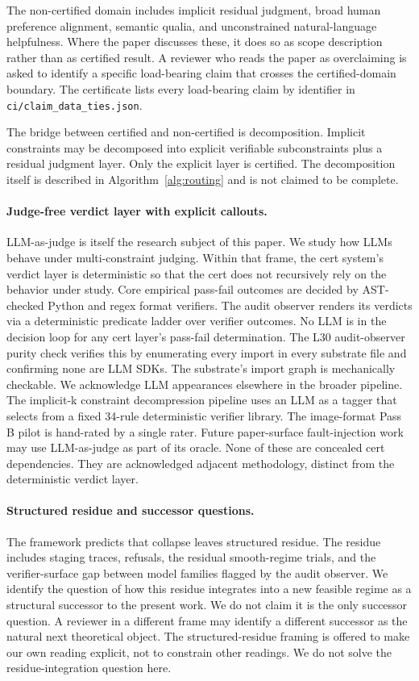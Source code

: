 The non-certified domain includes implicit residual judgment, broad human preference alignment, semantic qualia, and unconstrained natural-language helpfulness. Where the paper discusses these, it does so as scope description rather than as certified result. A reviewer who reads the paper as overclaiming is asked to identify a specific load-bearing claim that crosses the certified-domain boundary. The certificate lists every load-bearing claim by identifier in \texttt{ci/claim\_data\_ties.json}.

The bridge between certified and non-certified is decomposition. Implicit constraints may be decomposed into explicit verifiable subconstraints plus a residual judgment layer. Only the explicit layer is certified. The decomposition itself is described in Algorithm~\ref{alg:routing} and is not claimed to be complete.

\paragraph{Judge-free verdict layer with explicit callouts.}
LLM-as-judge is itself the research subject of this paper. We study how LLMs behave under multi-constraint judging. Within that frame, the cert system's verdict layer is deterministic so that the cert does not recursively rely on the behavior under study. Core empirical pass-fail outcomes are decided by AST-checked Python and regex format verifiers. The audit observer renders its verdicts via a deterministic predicate ladder over verifier outcomes. No LLM is in the decision loop for any cert layer's pass-fail determination. The L30 audit-observer purity check verifies this by enumerating every import in every substrate file and confirming none are LLM SDKs. The substrate's import graph is mechanically checkable. We acknowledge LLM appearances elsewhere in the broader pipeline. The implicit-k constraint decompression pipeline uses an LLM as a tagger that selects from a fixed 34-rule deterministic verifier library. The image-format Pass B pilot is hand-rated by a single rater. Future paper-surface fault-injection work may use LLM-as-judge as part of its oracle. None of these are concealed cert dependencies. They are acknowledged adjacent methodology, distinct from the deterministic verdict layer.

\paragraph{Structured residue and successor questions.}
The framework predicts that collapse leaves structured residue. The residue includes staging traces, refusals, the residual smooth-regime trials, and the verifier-surface gap between model families flagged by the audit observer. We identify the question of how this residue integrates into a new feasible regime as a structural successor to the present work. We do not claim it is the only successor question. A reviewer in a different frame may identify a different successor as the natural next theoretical object. The structured-residue framing is offered to make our own reading explicit, not to constrain other readings. We do not solve the residue-integration question here.

